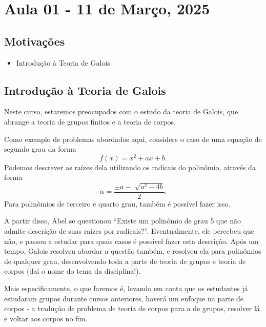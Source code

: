 \documentclass[../algebraIII_notes.tex]{subfiles}
\begin{document}
\section{Aula 01 - 11 de Março, 2025}
\subsection{Motivações}
\begin{itemize}
	\item Introdução à Teoria de Galois
\end{itemize}
\subsection{Introdução à Teoria de Galois}
Neste curso, estaremos preocupados com o estudo da teoria de Galois, que abrange a teoria de grupos finitos e a teoria de corpos.

Como exemplo de problemas abordados aqui, considere o caso de uma equação de segundo grau da forma
\[
	f(x) = x^{2} + ax + b.
\]
Podemos descrever as raízes dela utilizando os radicais do polinômio, através da forma
\[
	\alpha = \frac{\pm a - \sqrt[]{a^{2}-4b}}{2}.
\]
Para polinômios de terceiro e quarto grau, também é possível fazer isso.

A partir disso, Abel se questionou ``Existe um polinômio de grau 5 que não admite descrição de suas raízes por radicais?''. Eventualmente, ele percebeu que não, e passou a estudar para quais casos é possível fazer esta descrição.
Após um tempo, Galois resolveu abordar a questão também, e resolveu ela para polinômios de qualquer grau, desenvolvendo toda a parte de teoria de grupos e teoria de corpos (daí o nome do tema da disciplina!).

Mais especificamente, o que faremos é, levando em conta que os estudantes já estudaram grupos durante cursos anteriores, haverá um enfoque na parte de corpos - a tradução de problema de teoria de corpos para a de grupos, resolver lá e voltar aos corpos no fim.
\end{document}
